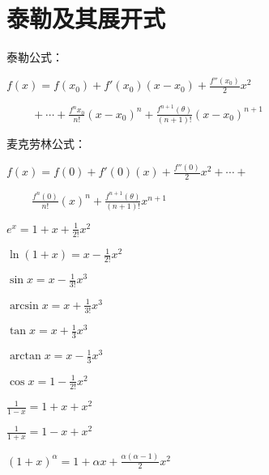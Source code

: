 \section{泰勒及其展开式}

{
    \noindent 泰勒公式：

    $\displaystyle f(x) = f(x_0) + f'(x_0)(x-x_0) + \frac{f''(x_0)}{2} x^2$

    $\displaystyle \qquad \  + \cdots + \frac{f^{n}x_0}{n!} (x-x_0)^n + \frac{f^{n+1}(\theta)}{(n+1)!}(x - x_0)^{n+1}$
}


{
    \noindent 麦克劳林公式：

    $\displaystyle f(x) = f(0) + f'(0)(x) + \frac{f''(0)}{2} x^2 + \cdots +$

    $\displaystyle \qquad \ \frac{f^{n}(0)}{n!} (x)^n + \frac{f^{n+1}(\theta)}{(n+1)!}x^{n+1}$
}

\begin{multicols}{2}
    \begin{spacing}{\hangju}
        \noindent $e^x = 1 + x + \frac{1}{2!}x^2$

        \noindent $\ln{(1 + x)} = x - \frac{1}{2!}x^2$

        \noindent $\sin{x} = x - \frac{1}{3!}x^{3}$

        \noindent $\arcsin{x} = x + \frac{1}{3!}x^{3}$

        \noindent $\tan{x} = x + \frac{1}{3}x^3$

        \noindent $\arctan{x} = x - \frac{1}{3}x^3$

        \noindent $\cos{x} = 1 - \frac{1}{2!}x^2$

        \noindent $\frac{1}{1 - x} = 1 + x + x^2$

        \noindent $\frac{1}{1 + x} = 1 - x + x^2$

        \noindent $(1 + x)^\alpha = 1 + \alpha x + \frac{\alpha(\alpha - 1)}{2}x^2$
    \end{spacing}
\end{multicols}

